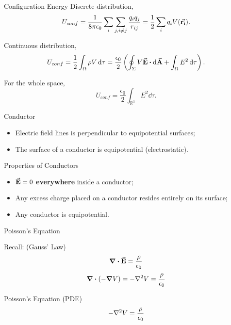 \documentclass{beamer}
\begin{document}
\begin{frame}{Configuration Energy}
    Discrete distribution,
    \begin{equation}
        U_{conf} = \frac{1}{8 \pi \epsilon_0} \sum_{i} \sum_{j, i \neq j} \frac{q_i q_j}{r_{ij}} = \frac{1}{2} \sum_{i} q_i V(\va{r_i}).
    \end{equation}

    Continuous distribution,
    \begin{equation}
        U_{conf} = \frac{1}{2} \int_{\Omega} \rho V \dd{\tau} = \frac{\epsilon_0}{2} \left( \oint_{\Sigma} V \va{E} \vdot \dd{\va{A}} + \int_{\Omega} E^2 \dd{\tau} \right).
    \end{equation}

    For the whole space,
    \begin{equation}
        U_{conf} = \frac{\epsilon_0}{2} \int_{\mathbb{R}^3} E^2 \dd{\tau}.
    \end{equation}
\end{frame}

\begin{frame}{Conductor}
    \begin{itemize}
        \item Electric field lines is perpendicular to equipotential surfaces;
        \item The surface of a conductor is equipotential (electrostatic).
    \end{itemize}
    \vspace{1em}
    \begin{beamerboxesrounded}[shadow=true]{Properties of Conductors}
        \begin{itemize}
            \item $\va{E} = 0$ \textbf{everywhere} inside a conductor;
            \item Any excess charge placed on a conductor resides entirely on its surface;
            \item Any conductor is equipotential.
        \end{itemize}
    \end{beamerboxesrounded}
\end{frame}


\begin{frame}{Poisson's Equation}
    \begin{block}{Recall: (Gauss' Law)}
        \begin{equation}
            \div{\va{E}} = \frac{\rho}{\epsilon_0}
        \end{equation}  
        \begin{equation}
            \div(-\grad{V}) = -\laplacian{V} = \frac{\rho}{\epsilon_0}
        \end{equation}
    \end{block}

    \begin{block}{Poisson's Equation (PDE)}
        \begin{equation}
            - \laplacian{V} = \frac{\rho}{\epsilon_0}
        \end{equation}
    \end{block}
\end{frame}
\end{document}
